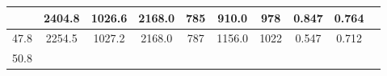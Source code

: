 \documentclass[a4paper,12pt]{article}
\begin{document}
\begin{longtable}{
     |
%    
    c|
%    
    c|
%    
    c|
%    
    c|
%    
    c|
%    
    c|
%    
    c|
%    
    c|
%    
    c|
%    
    c|
%    
    }
%        
        & 2404.8
%        

%        

%        
        & 1026.6
%        

%        

%        
        & 2168.0
%        

%        

%        
        & 785
%        

%        

%        
        & 910.0
%        

%        

%        
        & 978
%        

%        

%        
        & 0.847
%        

%        

%        
        & 0.764
%        

%        
        \\
        \hline

        

%        

%        
        47.8
%        

%        

%        
        & 2254.5
%        

%        

%        
        & 1027.2
%        

%        

%        
        & 2168.0
%        

%        

%        
        & 787
%        

%        

%        
        & 1156.0
%        

%        

%        
        & 1022
%        

%        

%        
        & 0.547
%        

%        

%        
        & 0.712
%        

%        
        \\
        \hline

        

%        

%        
        50.8
%        

%        


\end{longtable}
\end{document}
